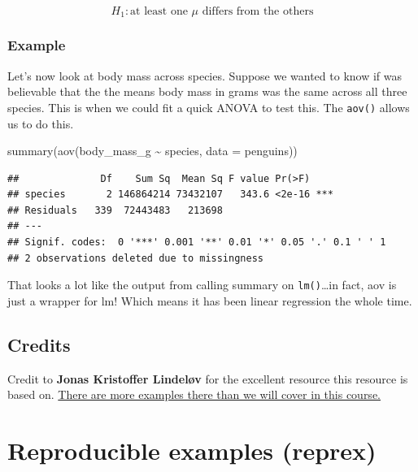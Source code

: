 \documentclass[
  openany]{book}
\newenvironment{Shaded}{\begin{snugshade}}{\end{snugshade}}
\newcommand{\AttributeTok}[1]{\textcolor[rgb]{0.77,0.63,0.00}{#1}}
\newcommand{\FunctionTok}[1]{\textcolor[rgb]{0.00,0.00,0.00}{#1}}
\newcommand{\NormalTok}[1]{#1}
\newcommand{\SpecialCharTok}[1]{\textcolor[rgb]{0.00,0.00,0.00}{#1}}
\begin{document}
\[H_1: \text{at least one }\mu \text{ differs from the others} \]

\hypertarget{example-3}{%
\subsubsection{Example}\label{example-3}}

Let's now look at body mass across species. Suppose we wanted to know if was believable that the the means body mass in grams was the same across all three species. This is when we could fit a quick ANOVA to test this. The \texttt{aov()} allows us to do this.

\begin{Shaded}
\begin{Highlighting}[]
\FunctionTok{summary}\NormalTok{(}\FunctionTok{aov}\NormalTok{(body\_mass\_g }\SpecialCharTok{\textasciitilde{}}\NormalTok{ species, }\AttributeTok{data =}\NormalTok{ penguins))}
\end{Highlighting}
\end{Shaded}

\begin{verbatim}
##              Df    Sum Sq  Mean Sq F value Pr(>F)    
## species       2 146864214 73432107   343.6 <2e-16 ***
## Residuals   339  72443483   213698                   
## ---
## Signif. codes:  0 '***' 0.001 '**' 0.01 '*' 0.05 '.' 0.1 ' ' 1
## 2 observations deleted due to missingness
\end{verbatim}

That looks a lot like the output from calling summary on \texttt{lm()}\ldots in fact, aov is just a wrapper for lm! Which means it has been linear regression the whole time.

\hypertarget{credits}{%
\subsection{Credits}\label{credits}}

Credit to \textbf{Jonas Kristoffer Lindeløv} for the excellent resource this resource is based on. \href{https://lindeloev.github.io/tests-as-linear/}{There are more examples there than we will cover in this course.}

\hypertarget{reproducible-examples-reprex}{%
\section{Reproducible examples (reprex)}\label{reproducible-examples-reprex}}
\end{document}
